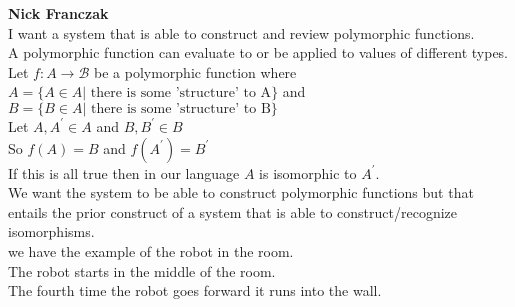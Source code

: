 \documentclass[12pt]{article}
\newcommand{\B}[0]{\mathcal{B}}
\begin{document}
\noindent
\textbf{Nick Franczak}\\ 
I want a system that is able to construct and review polymorphic functions.\\
A polymorphic function can evaluate to or be applied to values of different types.\\
Let $f: {A \rightarrow \B}$ be a polymorphic function where\\
${A} = \{A \in {A} \vert \text{ there is some 'structure' to A} \}$ and \\
${B} = \{B \in {A} \vert \text{ there is some 'structure' to B} \}$\\
Let $A, A^{'} \in {A}$ and $B, B^{'} \in {B}$\\
So $f(A) = B$ and $f(A^{'}) = B^{'}$\\
If this is all true then in our language $A$ is isomorphic to $A^{'}$.\\

\noindent We want the system to be able to construct polymorphic functions but that entails the prior construct of a system that is able to construct/recognize isomorphisms.\\

\noindent we have the example of the robot in the room.\\
The robot starts in the middle of the room.\\
The fourth time the robot goes forward it runs into the wall.\\
\end{document}
